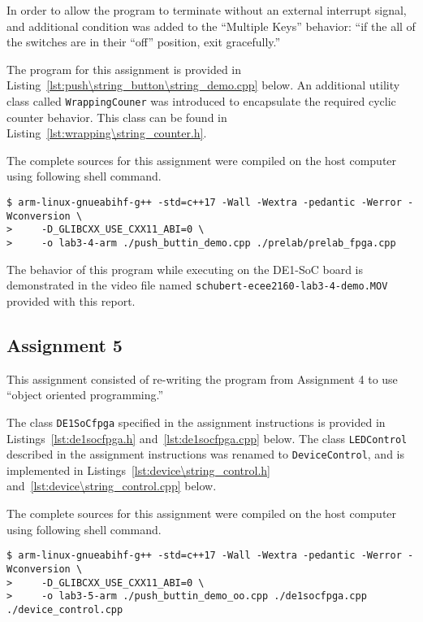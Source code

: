 \documentclass[11pt, letterpaper]{article} %
\begin{document}
In order to allow the program to terminate without an external interrupt signal, and additional condition was added to the ``Multiple Keys'' behavior: ``if the all of the switches are in their ``off'' position, exit gracefully.''

The program for this assignment is provided in Listing~\ref{lst:push\string_button\string_demo.cpp} below. An additional utility class called \texttt{WrappingCouner} was introduced to encapsulate the required cyclic counter behavior. This class can be found in Listing~\ref{lst:wrapping\string_counter.h}.

The complete sources for this assignment were compiled on the host computer using following shell command.

\begin{lstlisting}[style=labreportstyle-sh]
$ arm-linux-gnueabihf-g++ -std=c++17 -Wall -Wextra -pedantic -Werror -Wconversion \
>     -D_GLIBCXX_USE_CXX11_ABI=0 \
>     -o lab3-4-arm ./push_buttin_demo.cpp ./prelab/prelab_fpga.cpp
\end{lstlisting}

The behavior of this program while executing on the DE1-SoC board is demonstrated in the video file named \texttt{schubert-ecee2160-lab3-4-demo.MOV} provided with this report.

\subsection*{Assignment 5}
This assignment consisted of re-writing the program from Assignment 4 to use ``object oriented programming.''

The class \texttt{DE1SoCfpga} specified in the assignment instructions is provided in Listings~\ref{lst:de1socfpga.h} and~\ref{lst:de1socfpga.cpp} below. The class \texttt{LEDControl} described in the assignment instructions was renamed to \texttt{DeviceControl}, and is implemented in Listings~\ref{lst:device\string_control.h} and~\ref{lst:device\string_control.cpp} below. 

The complete sources for this assignment were compiled on the host computer using following shell command.

\begin{lstlisting}[style=labreportstyle-sh]
$ arm-linux-gnueabihf-g++ -std=c++17 -Wall -Wextra -pedantic -Werror -Wconversion \
>     -D_GLIBCXX_USE_CXX11_ABI=0 \
>     -o lab3-5-arm ./push_buttin_demo_oo.cpp ./de1socfpga.cpp ./device_control.cpp
\end{lstlisting}
\end{document}
